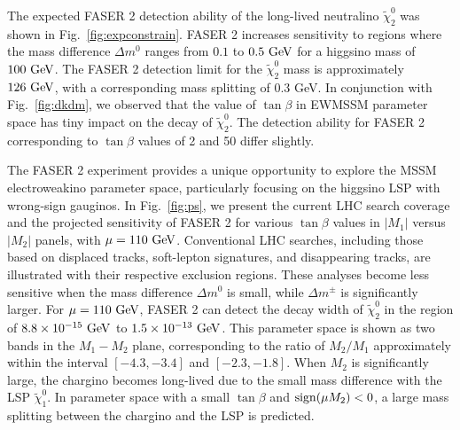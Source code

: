 \documentclass[letterpaper,11pt]{article}
\begin{document}
\par The expected FASER 2 detection ability of the long-lived neutralino $\tilde{\chi}_2^0$ was shown in Fig.~\ref{fig:expconstrain}. FASER 2 increases sensitivity to regions where the mass difference $\Delta m^0$ ranges from $0.1$ to $0.5~{\rm GeV}$ for a higgsino mass of $100~{\rm GeV}$. The FASER 2 detection limit for the $\tilde{\chi}_2^0$ mass is approximately $126~{\rm GeV}$, with a corresponding mass splitting of 0.3 GeV. 
In conjunction with Fig.~\ref{fig:dkdm}, we observed that the value of $\tan{\beta}$ in EWMSSM parameter space has tiny impact on the decay of $\tilde{\chi}_2^0$. The detection ability for FASER 2 corresponding to $\tan{\beta}$ values of 2 and 50 differ slightly. 

The FASER 2 experiment provides a unique opportunity to explore the MSSM electroweakino parameter space, particularly focusing on the higgsino LSP with wrong-sign gauginos. In Fig.~\ref{fig:ps}, we present the current LHC search coverage and the projected sensitivity of FASER 2 for various $\tan{\beta}$ values in $|M_1|$ versus $|M_2|$ panels, with $\mu = 110~{\rm GeV}$. Conventional LHC searches, including those based on displaced tracks, soft-lepton signatures, and disappearing tracks, are illustrated with their respective exclusion regions. These analyses become less sensitive when the mass difference $\Delta m^0$ is small, while $\Delta m^\pm$ is significantly larger. For $\mu = 110~{\rm GeV}$, FASER 2 can detect the decay width of $\tilde{\chi}_2^0$ in the region of $8.8\times 10^{-15}~{\rm GeV}$ to $1.5\times 10^{-13}~{\rm GeV}$. This parameter space is shown as two bands in the $M_1-M_2$ plane, corresponding to the ratio of $M_2/M_1$ approximately within the interval $[-4.3, -3.4]$ and $[-2.3, -1.8]$. When $ M_2 $ is significantly large, the chargino becomes long-lived due to the small mass difference with the LSP $\tilde{\chi}_1^0$. In parameter space with a small $\tan{\beta}$ and ${\rm sign}(\mu M_2) < 0$, a large mass splitting between the chargino and the LSP is predicted. 
\end{document}
